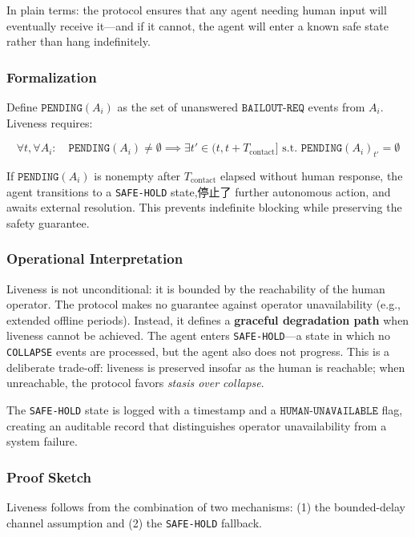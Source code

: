 In plain terms: the protocol ensures that any agent needing human input will eventually receive it—and if it cannot, the agent will enter a known safe state rather than hang indefinitely.

\subsubsection{Formalization}
Define $\texttt{PENDING}(A_i)$ as the set of unanswered $\texttt{BAILOUT-REQ}$ events from $A_i$. Liveness requires:

\[
\forall t, \forall A_i: \quad \texttt{PENDING}(A_i) \neq \emptyset \implies \exists t' \in (t, t + T_{\text{contact}}] \text{ s.t. } \texttt{PENDING}(A_i)_{t'} = \emptyset
\]

If $\texttt{PENDING}(A_i)$ is nonempty after $T_{\text{contact}}$ elapsed without human response, the agent transitions to a \texttt{SAFE-HOLD} state,停止了 further autonomous action, and awaits external resolution. This prevents indefinite blocking while preserving the safety guarantee.

\subsubsection{Operational Interpretation}
Liveness is not unconditional: it is bounded by the reachability of the human operator. The protocol makes no guarantee against operator unavailability (e.g., extended offline periods). Instead, it defines a \textbf{graceful degradation path} when liveness cannot be achieved. The agent enters \texttt{SAFE-HOLD}—a state in which no \texttt{COLLAPSE} events are processed, but the agent also does not progress. This is a deliberate trade-off: liveness is preserved insofar as the human is reachable; when unreachable, the protocol favors \emph{stasis over collapse}.

The \texttt{SAFE-HOLD} state is logged with a timestamp and a $\texttt{HUMAN-UNAVAILABLE}$ flag, creating an auditable record that distinguishes operator unavailability from a system failure.

\subsubsection{Proof Sketch}
Liveness follows from the combination of two mechanisms: (1) the bounded-delay channel assumption and (2) the \texttt{SAFE-HOLD} fallback.

